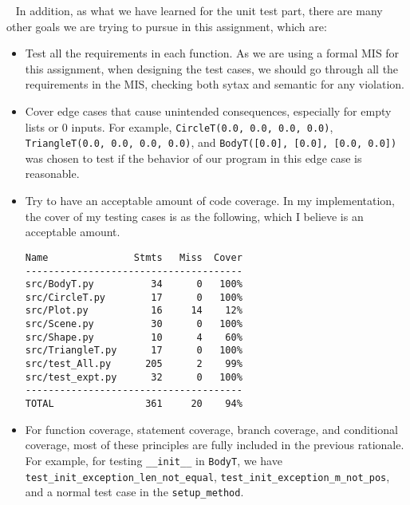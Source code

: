 \documentclass[12pt]{article}
\begin{document}
~\newline\noindent
In addition, as what we have learned for the unit test part, there are many other goals we are trying to pursue in this assignment, which are:
\begin{itemize}
\item Test all the requirements in each function. As we are using a formal MIS for this assignment, when designing the test cases, we should go through all the requirements in the MIS, checking both sytax and semantic for any violation.
\item Cover edge cases that cause unintended consequences, especially for empty lists or 0 inputs. For example, \verb|CircleT(0.0, 0.0, 0.0, 0.0)|, \verb|TriangleT(0.0, 0.0, 0.0, 0.0)|, and  \verb|BodyT([0.0], [0.0], [0.0, 0.0])| was chosen to test if the behavior of our program in this edge case is reasonable.
\item Try to have an acceptable amount of code coverage. In my implementation, the cover of my testing cases is as the following, which I believe is an acceptable amount.
\begin{lstlisting}
Name               Stmts   Miss  Cover
--------------------------------------
src/BodyT.py          34      0   100%
src/CircleT.py        17      0   100%
src/Plot.py           16     14    12%
src/Scene.py          30      0   100%
src/Shape.py          10      4    60%
src/TriangleT.py      17      0   100%
src/test_All.py      205      2    99%
src/test_expt.py      32      0   100%
--------------------------------------
TOTAL                361     20    94%
\end{lstlisting}
\item For function coverage, statement coverage, branch coverage, and conditional coverage, most of these principles are fully included in the previous rationale. For example, for testing \verb|__init__| in \verb|BodyT|, we have \verb|test_init_exception_len_not_equal|, \verb|test_init_exception_m_not_pos|, and a normal test case in the \verb|setup_method|.
\end{itemize}
\end{document}
